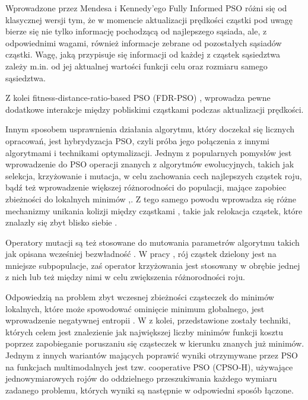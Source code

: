 \documentclass[12pt, twoside, openany, abstract=on]{report}
\theoremstyle{definition}
\begin{document}
Wprowadzone przez Mendesa i Kennedy’ego \cite{FullyInformedPso} Fully Informed PSO różni się od klasycznej wersji tym, że w momencie aktualizacji prędkości cząstki pod uwagę bierze się nie tylko informację pochodzącą od najlepszego sąsiada, ale, z odpowiednimi wagami, również informacje zebrane od pozostałych sąsiadów cząstki. Wagę, jaką przypisuje się informacji od każdej z cząstek sąsiedztwa zależy m.in. od jej aktualnej wartości funkcji celu oraz rozmiaru samego sąsiedztwa.


Z kolei fitness-distance-ratio-based PSO (FDR-PSO) \cite{FitnessDistRatio}, wprowadza pewne dodatkowe interakcje między pobliskimi cząstkami podczas aktualizacji prędkości.

Innym sposobem usprawnienia działania algorytmu, który doczekał się licznych opracowań, jest hybrydyzacja PSO, czyli próba jego połączenia z innymi algorytmami i technikami optymalizacji. Jednym z popularnych pomysłów jest wprowadzenie do PSO operacji znanych z algorytmów ewolucyjnych, takich jak selekcja, krzyżowanie i mutacja, w celu zachowania cech najlepszych cząstek roju, bądź też wprowadzenie większej różnorodności do populacji, mające zapobiec zbieżności do lokalnych minimów \cite{SelectionPso},\cite{HybridPsoBreedingSubpop}. Z tego samego powodu wprowadza się różne mechanizmy unikania kolizji między cząstkami \cite{CollisionAvoiding}, takie jak relokacja cząstek, które znalazły się zbyt blisko siebie \cite{PsoCriticality}. 

Operatory mutacji są też stosowane do mutowania parametrów algorytmu takich jak opisana wcześniej bezwładność \cite{EPso}. W pracy \cite{HybridPsoBreedingSubpop}, rój cząstek dzielony jest na mniejsze subpopulacje, zaś operator krzyżowania jest stosowany w obrębie jednej z nich lub też między nimi w celu zwiększenia różnorodności roju. 
  
Odpowiedzią na problem zbyt wczesnej zbieżności cząsteczek do minimów lokalnych, które może spowodować ominięcie minimum globalnego, jest wprowadzenie negatywnej entropii \cite{DissipativePso}. W \cite{ComputGlobOptPso} z kolei, przedstawione zostały techniki, których celem jest znalezienie jak największej liczby minimów funkcji kosztu poprzez zapobieganie poruszaniu się cząsteczek w kierunku znanych już minimów.
Jednym z innych wariantów mających poprawić wyniki otrzymywane przez PSO na funkcjach multimodalnych jest tzw. cooperative PSO (CPSO-H), używające jednowymiarowych rojów do oddzielnego przeszukiwania każdego wymiaru zadanego problemu, których wyniki są następnie w odpowiedni sposób łączone.
\end{document}
